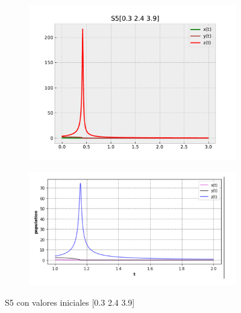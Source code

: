 \documentclass{wscpaperproc}
\theoremstyle{wsc}
\begin{document}
\begin{figure}[h]
	\centering
	\begin{subfigure}[b]{0.5\textwidth}
		\centering
		\includegraphics[width=\textwidth]{Simulations/S5[0.3 2.4 3.9].pdf}
	
		\label{fig:comparativa91}
	\end{subfigure}%
	\begin{subfigure}[b]{0.5\textwidth}
		\centering
		\includegraphics[width=\textwidth]{GraficasPaper/S5[1].png}
		\label{fig:comparativa92}
	\end{subfigure}
	\caption{S5 con valores iniciales [0.3 2.4 3.9]}

	\label{fig:comparacion13}
\end{figure}
\end{document}
